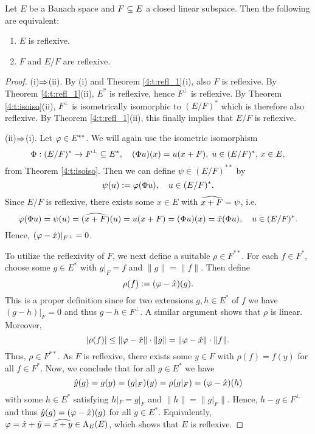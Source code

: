 \begin{theo}
Let $E$ be a Banach space and $F\subseteq E$ a closed linear subspace. Then the following are equivalent:
\begin{enumerate}
\item[(i)] $E$ is reflexive.
\item[(ii)] $F$ and $E/F$ are reflexive.
\end{enumerate}
\end{theo}
\begin{proof}
(i)$\Rightarrow$(ii). By (i) and Theorem \ref{4:t:refl_1}(i), also $F$ is reflexive. By Theorem \ref{4:t:refl_1}(ii), $E^*$ is reflexive, hence $F^\perp$ is reflexive. By Theorem \ref{4:t:isoiso}(ii), $F^\perp$ is isometrically isomorphic to $(E/F)^*$ which is therefore also reflexive. By Theorem \ref{4:t:refl_1}(ii), this finally implies that $E/F$ is reflexive.

(ii)$\Rightarrow$(i). Let $\varphi\in E^{**}$. We will again use the isometric isomorphism
$$
\Phi : (E/F)^*\to F^\perp\subseteq E^*,\quad (\Phi u)(x) = u(x+F),\;u\in (E/F)^*,\,x\in E,
$$
from Theorem \ref{4:t:isoiso}. Then we can define $\psi\in (E/F)^{**}$ by
$$
\psi(u) := \varphi(\Phi u),\quad u\in (E/F)^*.
$$
Since $E/F$ is reflexive, there exists some $x\in E$ with $\widehat{x+F} = \psi$, i.e.
$$
\varphi(\Phi u) = \psi(u) = (\widehat{x+F})(u) = u(x+F) = (\Phi u)(x) = \hat x(\Phi u),\quad u\in(E/F)^*.
$$
Hence, $(\varphi - \hat x)|_{F^\perp} = 0$.

To utilize the reflexivity of $F$, we next define a suitable $\rho\in F^{**}$. For each $f\in F^*$, choose some $g\in E^*$ with $g|_F = f$ and $\|g\| = \|f\|$. Then define
$$
\rho(f) := (\varphi - \hat x)(g).
$$
This is a proper definition since for two extensions $g,h\in E^*$ of $f$ we have $(g - h)|_F = 0$ and thus $g - h\in F^\perp$. A similar argument shows that $\rho$ is linear. Moreover,
$$
|\rho(f)|\le\|\varphi - \hat x\|\cdot\|g\| = \|\varphi - \hat x\|\cdot\|f\|.
$$
Thus, $\rho\in F^{**}$. As $F$ is reflexive, there exists some $y\in F$ with $\rho(f) = f(y)$ for all $f\in F^*$. Now, we conclude that for all $g\in E^*$ we have
$$
\hat y(g) = g(y) = (g|_F)(y) = \rho(g|_F) = (\varphi - \hat x)(h)
$$
with some $h\in E^*$ satisfying $h|_F = g|_F$ and $\|h\| = \|g|_F\|$. Hence, $h - g\in F^\perp$ and thus $\hat y(g) = (\varphi - \hat x)(g)$ for all $g\in E^*$. Equivalently, $\varphi = \hat x + \hat y = \widehat{x + y}\in\Lambda_E(E)$, which shows that $E$ is reflexive.
\end{proof}

